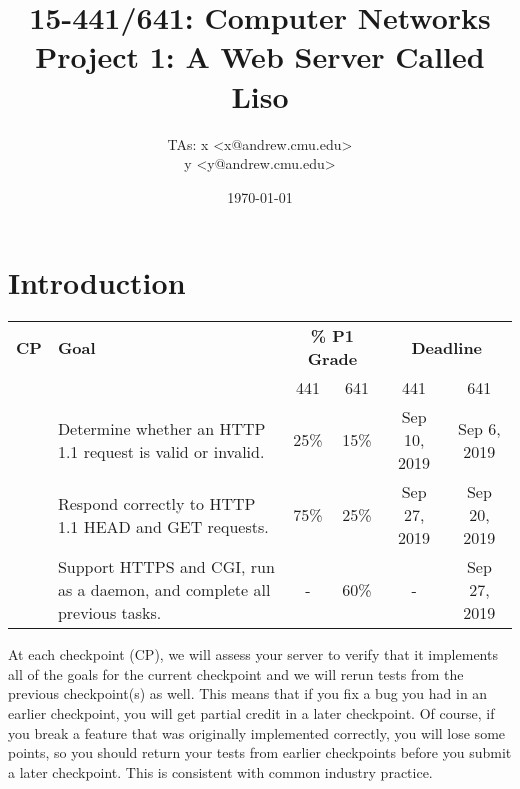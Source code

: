 \documentclass{article}
\begin{document}
\title{	15-441/641: Computer Networks\\
Project 1: A Web Server Called Liso\\
}

\author{TAs: x <x@andrew.cmu.edu> \\
y <y@andrew.cmu.edu>}
\date{\today}

\maketitle


\section{Introduction}


\begin{center}
\vspace{10pt}
\begin{tabular}{cp{2.5in}cccc}
  {\bf CP}&{\bf Goal}&\multicolumn{2}{c}{{\bf \% P1 Grade}}&\multicolumn{2}{c}{{\bf Deadline}}\\
  & & 441 & 641 & 441 & 641 \\

  \hline
  
  \addlinespace[5pt]
  1&Determine whether an HTTP 1.1 request is valid or invalid. & 25\% & 15\% & Sep 10, 2019 & Sep 6, 2019 \\
  
  \addlinespace[5pt]
  2&Respond correctly to HTTP 1.1 HEAD and GET requests. & 75\% & 25\% & Sep 27, 2019 & Sep 20, 2019   \\
  
  \addlinespace[5pt]
  3&Support HTTPS and CGI, run as a daemon, and complete all previous tasks. & - & 60\% & - & Sep 27, 2019\\
\end{tabular}
\end{center}

\noindent At each checkpoint (CP), we will assess your server to
verify that it implements all of the goals for the current checkpoint
and we will rerun tests from the previous checkpoint(s) as well.  This
means that if you fix a bug you had in an earlier checkpoint, you will
get partial credit in a later checkpoint.  Of course, if you break a
feature that was originally implemented correctly, you will lose some
points, so you should return your tests from earlier checkpoints
before you submit a later checkpoint.  This is consistent with common
industry practice.
\end{document}
